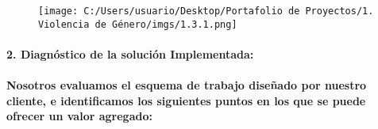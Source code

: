 \documentclass[]{article}
\let\oldparagraph\paragraph
\renewcommand{\paragraph}[1]{\oldparagraph{#1}\mbox{}}
\begin{document}
\begin{figure}
\centering
\texttt{[image: C:/Users/usuario/Desktop/Portafolio de Proyectos/1. Violencia de Género/imgs/1.3.1.png]}
\caption{}
\end{figure}

\paragraph{\texorpdfstring{\textbf{2. Diagnóstico de la solución
Implementada:}}{2. Diagnóstico de la solución Implementada:}}\label{diagnostico-de-la-solucion-implementada}

\paragraph{Nosotros evaluamos el esquema de trabajo diseñado por nuestro
cliente, e identificamos los siguientes puntos en los que se puede
ofrecer un valor
agregado:}\label{nosotros-evaluamos-el-esquema-de-trabajo-disenado-por-nuestro-cliente-e-identificamos-los-siguientes-puntos-en-los-que-se-puede-ofrecer-un-valor-agregado}
\end{document}
